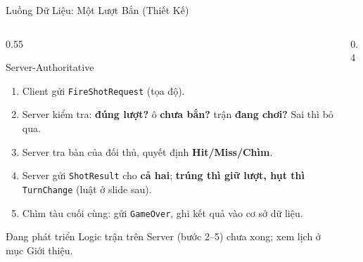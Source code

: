 \begin{frame}{Luồng Dữ Liệu: Một Lượt Bắn (Thiết Kế)}
  \begin{columns}[T]
    \begin{column}{0.55\textwidth}
      \begin{block}{Server-Authoritative}
        \begin{enumerate}\setlength{\itemsep}{0pt}
          \item Client gửi \texttt{FireShotRequest} (tọa độ).
          \item Server kiểm tra: \textbf{đúng lượt?} ô \textbf{chưa bắn?} trận \textbf{đang chơi?} Sai thì bỏ qua.
          \item Server tra bàn của đối thủ, quyết định \textbf{Hit/Miss/Chìm}.
          \item Server gửi \texttt{ShotResult} cho \textbf{cả hai}; \textbf{trúng thì giữ lượt, hụt thì} \texttt{TurnChange} (luật ở slide sau).
          \item Chìm tàu cuối cùng: gửi \texttt{GameOver}, ghi kết quả vào cơ sở dữ liệu.
        \end{enumerate}
      \end{block}
      \begin{alertblock}{Đang phát triển}
        Logic trận trên Server (bước 2--5) chưa xong; xem lịch ở mục Giới thiệu.
      \end{alertblock}
    \end{column}
    \begin{column}{0.4\textwidth}
      \centering
    \end{column}
  \end{columns}
\end{frame}

